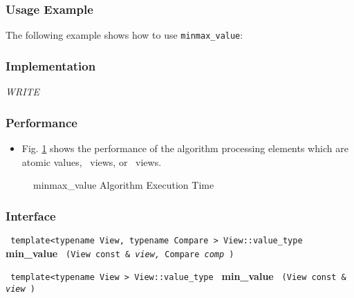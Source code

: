 \subsubsection{Usage Example} %

The following example shows how to use \texttt{minmax\_value}:

 
\subsubsection{Implementation} %

\textit{WRITE}

\subsubsection{Performance} %

\begin{itemize}
\item
Fig. \ref{fig:minmax-alg-exec-exper}
shows the performance of the algorithm processing
elements which are atomic values, \stl\ views, or \stapl\ views.
\end{itemize}

\begin{figure}[p]
\caption{minmax\_value Algorithm Execution Time}
\label{fig:minmax-alg-exec-exper}
\end{figure}

 
\subsubsection{Interface} %

\noindent
\texttt{%
template<typename View, typename Compare >
\newline
View::value\_type 
}
\newline
\textbf{min\_value}%
\texttt{%
(View const \&
\textit{view,}%
Compare 
\textit{comp}%
)
}
\vspace{0.4cm}

\noindent
\texttt{%
template<typename View >
\newline
View::value\_type 
}
\newline
\textbf{min\_value}%
\texttt{%
(View const \&
\textit{view}%
)
}

